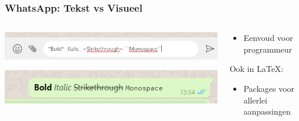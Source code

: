 \documentclass[presentatie.tex]{subfiles}
\begin{document}
    \begin{frame}
        \frametitle{WhatsApp: Tekst vs Visueel}
        \begin{columns}
            \begin{column}{0.5\textwidth}
                \includegraphics[width=\linewidth]{assets/whatsappStyles2.png}
                
                \bigskip
                
                \includegraphics[width=\linewidth]{assets/whatsappStylesResult2.png}
            \end{column}
            \begin{column}{0.5\textwidth}
                \begin{itemize}
                    \item Eenvoud voor programmeur
                \end{itemize}
                \medskip

                Ook in \LaTeX:
                \begin{itemize}
                    \item Packages voor allerlei aanpassingen
                \end{itemize}
            \end{column}
        \end{columns}
    \end{frame}
    
                
\end{document}

